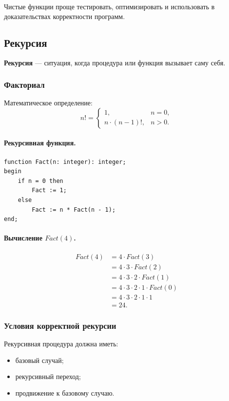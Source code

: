 \documentclass[12pt,a4paper]{article}
\begin{document}
Чистые функции проще тестировать, оптимизировать и использовать в доказательствах корректности программ.

\subsection{Рекурсия}

\textbf{Рекурсия} --- ситуация, когда процедура или функция вызывает саму себя.

\subsubsection{Факториал}

Математическое определение:
\[
    n! =
    \begin{cases}
        1, & n = 0,\\
        n \cdot (n-1)!, & n > 0.
    \end{cases}
\]

\paragraph{Рекурсивная функция.}

\begin{verbatim}
function Fact(n: integer): integer;
begin
    if n = 0 then
        Fact := 1;
    else
        Fact := n * Fact(n - 1);
end;
\end{verbatim}

\paragraph{Вычисление $Fact(4)$.}

\[
\begin{aligned}
Fact(4) &= 4 \cdot Fact(3)\\
        &= 4 \cdot 3 \cdot Fact(2)\\
        &= 4 \cdot 3 \cdot 2 \cdot Fact(1)\\
        &= 4 \cdot 3 \cdot 2 \cdot 1 \cdot Fact(0)\\
        &= 4 \cdot 3 \cdot 2 \cdot 1 \cdot 1\\
        &= 24.
\end{aligned}
\]

\subsubsection{Условия корректной рекурсии}

Рекурсивная процедура должна иметь:
\begin{itemize}
    \item базовый случай;
    \item рекурсивный переход;
    \item продвижение к базовому случаю.
\end{itemize}
\end{document}
